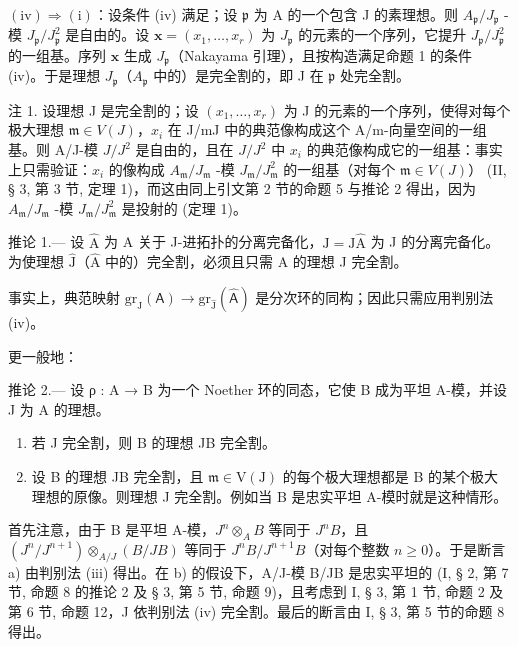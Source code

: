 \((\mathrm{iv}) \Rightarrow (\mathrm{i})\)：设条件 (iv) 满足；设 \(\mathfrak{p}\) 为 A 的一个包含 J 的素理想。则 \(A_{\mathfrak{p}} / J_{\mathfrak{p}}\) -模 \(J_{\mathfrak{p}} / J_{\mathfrak{p}}^2\) 是自由的。设 \(\mathbf{x} = (x_1, \ldots, x_r)\) 为 \(J_{\mathfrak{p}}\) 的元素的一个序列，它提升 \(J_{\mathfrak{p}} / J_{\mathfrak{p}}^2\) 的一组基。序列 \(\mathbf{x}\) 生成 \(J_{\mathfrak{p}}\)（Nakayama 引理），且按构造满足命题 1 的条件 (iv)。于是理想 \(J_{\mathfrak{p}}\)（\(A_{\mathfrak{p}}\) 中的）是完全割的，即 J 在 \(\mathfrak{p}\) 处完全割。

注 1. 设理想 J 是完全割的；设 \((x_1, \ldots, x_r)\) 为 J 的元素的一个序列，使得对每个极大理想 \(\mathfrak{m} \in V(J)\)，\(x_i\) 在 J/mJ 中的典范像构成这个 A/m-向量空间的一组基。则 A/J-模 \(J/J^2\) 是自由的，且在 \(J/J^2\) 中 \(x_i\) 的典范像构成它的一组基：事实上只需验证：\(x_i\) 的像构成 \(A_{\mathfrak{m}}/J_{\mathfrak{m}}\) -模 \(J_{\mathfrak{m}}/J_{\mathfrak{m}}^2\) 的一组基（对每个 \(\mathfrak{m} \in V(J)\)） (II, § 3, 第 3 节, 定理 1)，而这由同上引文第 2 节的命题 5 与推论 2 得出，因为 \(A_{\mathfrak{m}}/J_{\mathfrak{m}}\) -模 \(J_{\mathfrak{m}}/J_{\mathfrak{m}}^2\) 是投射的 (定理 1)。

推论 1.--- 设 \(\widehat{\mathrm{A}}\) 为 A 关于 J-进拓扑的分离完备化，\(\widehat{\mathrm{J}} = \mathrm{J}\widehat{\mathrm{A}}\) 为 J 的分离完备化。为使理想 \(\widehat{\mathrm{J}}\)（\(\widehat{\mathrm{A}}\) 中的）完全割，必须且只需 A 的理想 J 完全割。

事实上，典范映射 \(\mathrm{gr}_{\mathrm{J}}(\mathsf{A}) \to \mathrm{gr}_{\widehat{\mathrm{J}}}(\widehat{\mathsf{A}})\) 是分次环的同构；因此只需应用判别法 (iv)。

更一般地：

推论 2.--- 设 ρ : A → B 为一个 Noether 环的同态，它使 B 成为平坦 A-模，并设 J 为 A 的理想。

\begin{enumerate}
\def\labelenumi{\alph{enumi})}
\item
  若 J 完全割，则 B 的理想 JB 完全割。
\item
  设 B 的理想 JB 完全割，且 \(\mathfrak{m} \in \mathrm{V}(\mathrm{J})\) 的每个极大理想都是 B 的某个极大理想的原像。则理想 J 完全割。例如当 B 是忠实平坦 A-模时就是这种情形。
\end{enumerate}

首先注意，由于 B 是平坦 A-模，\(J^n \otimes_A B\) 等同于 \(J^n B\)，且 \((J^n / J^{n+1}) \otimes_{A/J} (B/JB)\) 等同于 \(J^n B / J^{n+1} B\)（对每个整数 \(n \geqslant 0\)）。于是断言 a) 由判别法 (iii) 得出。在 b) 的假设下，A/J-模 B/JB 是忠实平坦的 (I, § 2, 第 7 节, 命题 8 的推论 2 及 § 3, 第 5 节, 命题 9)，且考虑到 I, § 3, 第 1 节, 命题 2 及第 6 节, 命题 12，J 依判别法 (iv) 完全割。最后的断言由 I, § 3, 第 5 节的命题 8 得出。

